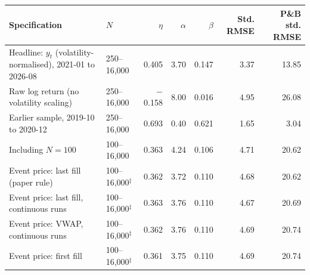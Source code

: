 \begin{tabular}{llrrrrr}
\toprule
Specification & \(N\) & \(\eta\) & \(\alpha\) & \(\beta\) & Std. RMSE & P\&B std. RMSE \\
\midrule
Headline: \(y_t\) (volatility-normalised), 2021-01 to 2026-08 & 250--16,000 & 0.405 & 3.70 & 0.147 & 3.37 & 13.85 \\
Raw log return (no volatility scaling) & 250--16,000 & $-$0.158 & 8.00 & 0.016 & 4.95 & 26.08 \\
Earlier sample, 2019-10 to 2020-12 & 250--16,000 & 0.693 & 0.40 & 0.621 & 1.65 & 3.04 \\
Including \(N=100\) & 100--16,000 & 0.363 & 4.24 & 0.106 & 4.71 & 20.62 \\
\addlinespace
Event price: last fill (paper rule) & 100--16,000\(^\ddagger\) & 0.362 & 3.72 & 0.110 & 4.68 & 20.62 \\
Event price: last fill, continuous runs & 100--16,000\(^\ddagger\) & 0.363 & 3.76 & 0.110 & 4.67 & 20.69 \\
Event price: VWAP, continuous runs & 100--16,000\(^\ddagger\) & 0.362 & 3.76 & 0.110 & 4.69 & 20.74 \\
Event price: first fill & 100--16,000\(^\ddagger\) & 0.361 & 3.75 & 0.110 & 4.69 & 20.74 \\
\bottomrule
\end{tabular}
